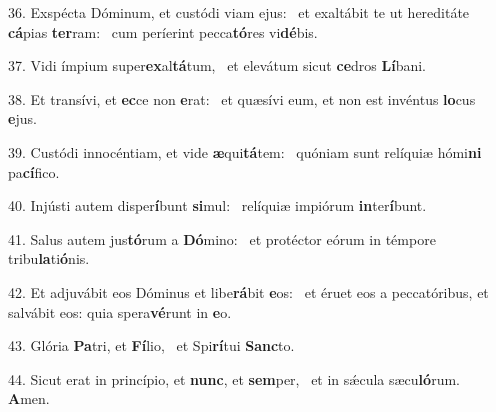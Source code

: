 36. Exspécta Dóminum, et custódi viam ejus: \dag\  et exaltábit te ut hereditáte \textbf{cá}pias \textbf{ter}ram: \ast\  cum períerint pecca\textbf{tó}res vi\textbf{dé}bis.\

37. Vidi ímpium super\textbf{ex}al\textbf{tá}tum, \ast\  et elevátum sicut \textbf{ce}dros \textbf{Lí}bani.\

38. Et transívi, et \textbf{ec}ce non \textbf{e}rat: \ast\  et quæsívi eum, et non est invéntus \textbf{lo}cus \textbf{e}jus.\

39. Custódi innocéntiam, et vide \textbf{æ}qui\textbf{tá}tem: \ast\  quóniam sunt relíquiæ hómi\textbf{ni} pa\textbf{cí}fico.\

40. Injústi autem disper\textbf{í}bunt \textbf{si}mul: \ast\  relíquiæ impiórum \textbf{in}ter\textbf{í}bunt.\

41. Salus autem jus\textbf{tó}rum a \textbf{Dó}mino: \ast\  et protéctor eórum in témpore tribu\textbf{la}ti\textbf{ó}nis.\

42. Et adjuvábit eos Dóminus et libe\textbf{rá}bit \textbf{e}os: \ast\  et éruet eos a peccatóribus, et salvábit eos: quia spera\textbf{vé}runt in \textbf{e}o.\

43. Glória \textbf{Pa}tri, et \textbf{Fí}lio, \ast\  et Spi\textbf{rí}tui \textbf{Sanc}to.\

44. Sicut erat in princípio, et \textbf{nunc}, et \textbf{sem}per, \ast\  et in sǽcula sæcu\textbf{ló}rum. \textbf{A}men.\

